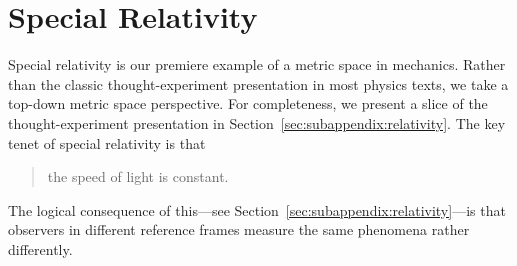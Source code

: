 
\chapter{Special Relativity}

Special relativity is our premiere example of a metric space in mechanics. Rather than the classic thought-experiment presentation in most physics texts, we take a top-down metric space perspective. For completeness, we present a slice of the thought-experiment presentation in Section~\ref{sec:subappendix:relativity}. The key tenet of special relativity is that 
\begin{quote}
the speed of light is constant.
\end{quote}
The logical consequence of this---see Section~\ref{sec:subappendix:relativity}---is that observers in different reference frames measure the same phenomena rather differently.


